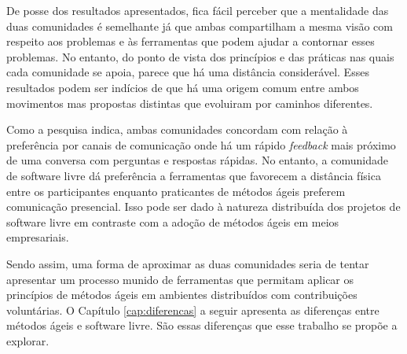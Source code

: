 De posse dos resultados apresentados, fica fácil perceber que a
mentalidade das duas comunidades é semelhante já que ambas
compartilham a mesma visão com respeito aos problemas e às ferramentas
que podem ajudar a contornar esses problemas. No entanto, do ponto de
vista dos princípios e das práticas nas quais cada comunidade se
apoia, parece que há uma distância considerável. Esses resultados
podem ser indícios de que há uma origem comum entre ambos movimentos
mas propostas distintas que evoluiram por caminhos diferentes.

Como a pesquisa indica, ambas comunidades concordam com relação à
preferência por canais de comunicação onde há um rápido
\textit{feedback} mais próximo de uma conversa com perguntas e
respostas rápidas. No entanto, a comunidade de software livre dá
preferência a ferramentas que favorecem a distância física entre os
participantes enquanto praticantes de métodos ágeis preferem
comunicação presencial. Isso pode ser dado à natureza distribuída dos
projetos de software livre em contraste com a adoção de
métodos ágeis em meios empresariais.

Sendo assim, uma forma de aproximar as duas comunidades seria de
tentar apresentar um processo munido de ferramentas que permitam
aplicar os princípios de métodos ágeis em ambientes distribuídos com
contribuições voluntárias. O Capítulo \ref{cap:diferencas} a seguir
apresenta as diferenças entre métodos ágeis e software livre. São
essas diferenças que esse trabalho se propõe a explorar.

